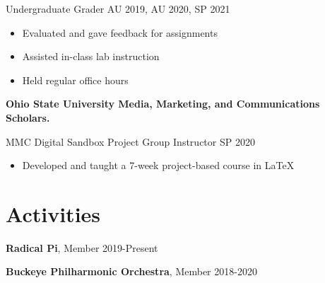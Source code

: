 \documentclass[10pt]{moderncv}
\begin{document}
Undergraduate Grader
\hfill AU 2019, AU 2020, SP 2021
\begin{itemize}
    \item Evaluated and gave feedback for assignments
    \item Assisted in-class lab instruction
    \item Held regular office hours
\end{itemize}

\textbf{Ohio State University Media, Marketing, and Communications Scholars.}

MMC Digital Sandbox Project Group Instructor
\hfill SP 2020
\begin{itemize}
    \item Developed and taught a 7-week project-based course in LaTeX
\end{itemize}

\section*{Activities}

\textbf{Radical Pi}, Member \hfill 2019-Present

\textbf{Buckeye Philharmonic Orchestra}, Member \hfill 2018-2020
\end{document}
